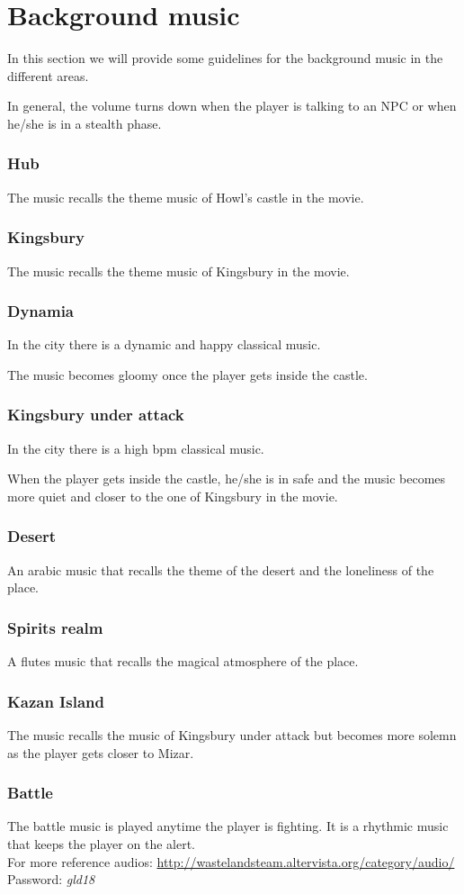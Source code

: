 \section{Background music}
In this section we will provide some guidelines for the background music in the different areas.

In general, the volume turns down when the player is talking to an NPC or when he/she is in a stealth phase.

\subsubsection{Hub}
The music recalls the theme music of Howl's castle in the movie.

\subsubsection{Kingsbury}
The music recalls the theme music of Kingsbury in the movie.

\subsubsection{Dynamia}
In the city there is a dynamic and happy classical music.

The music becomes gloomy once the player gets inside the castle.

\subsubsection{Kingsbury under attack}
In the city there is a high bpm classical music.

When the player gets inside the castle, he/she is in safe and the music becomes more quiet and closer to the one of Kingsbury in the movie.

\subsubsection{Desert}
An arabic music that recalls the theme of the desert and the loneliness of the place.

\subsubsection{Spirits realm}
A flutes music that recalls the magical atmosphere of the place.

\subsubsection{Kazan Island}
The music recalls the music of Kingsbury under attack but becomes more solemn as the player gets closer to Mizar.

\subsubsection{Battle}
The battle music is played anytime the player is fighting. It is a rhythmic music that keeps the player on the alert. \\

For more reference audios: \url{http://wastelandsteam.altervista.org/category/audio/}\\
Password: \textit{gld18}
